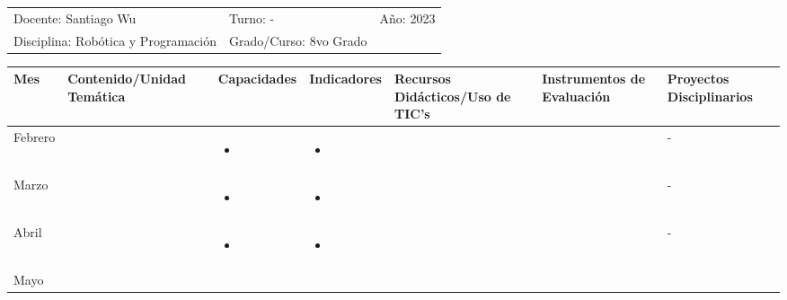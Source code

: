 \documentclass[landscape, a4paper, 10pt]{article}
\newcommand{\smallcellwidth}{0.7in}
\newcommand{\normalcellwidth}{1.2in}
\newcommand{\bigcellwidth}{2.0in}
\newcommand{\profesor}{Santiago Wu}
\newcommand{\discipline}{Robótica y Programación}
\newcommand{\currentyear}{2023}
\begin{document}
	\pagebreak[4]
	\begin{tabularx}{\textwidth}{ >{\raggedright\arraybackslash}X >{\raggedright\arraybackslash}X >{\raggedright\arraybackslash}X }
		Docente: \profesor &
		Turno: - &
		Año: \currentyear \\
		Disciplina: \discipline &
		Grado/Curso: 8vo Grado &
		 \\
	\end{tabularx}
	\centering
	\begin{longtable}{|m{\smallcellwidth}|p{\normalcellwidth}|p{\bigcellwidth}|p{\bigcellwidth}|p{\normalcellwidth}|p{\normalcellwidth}|p{\normalcellwidth}|}
		\hline
		\textbf{Mes} &
		\textbf{Contenido/Unidad Temática} &
		\textbf{Capacidades} &
		\textbf{Indicadores} &
		\textbf{Recursos Didácticos/Uso de TIC's} &
		\textbf{Instrumentos de Evaluación} &
		\textbf{Proyectos Disciplinarios} \\
		\hline
		\endhead
		Febrero &
		 &
		\begin{itemize}
			\item 
		\end{itemize} &
		\begin{itemize}
			\item 
		\end{itemize} &
		  &
		  &
		 - \\
		\hline
		Marzo &
		 &
		\begin{itemize}
			\item 
		\end{itemize} &
		\begin{itemize}
			\item 
		\end{itemize} &
		  &
		  &
		 - \\
		\hline
		Abril &
		 &
		\begin{itemize}
			\item 
		\end{itemize} &
		\begin{itemize}
			\item 
		\end{itemize} &
		  &
		  &
		 - \\
		\hline
		Mayo &
		 &
		\begin{itemize}

\end{itemize}
\end{longtable}
\end{document}
